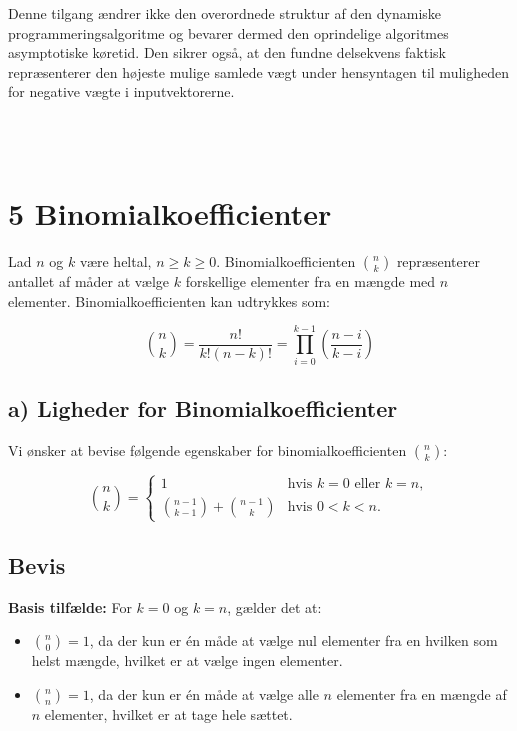 \documentclass{article}
\begin{document}
Denne tilgang ændrer ikke den overordnede struktur af den dynamiske programmeringsalgoritme og bevarer dermed den oprindelige algoritmes asymptotiske køretid. Den sikrer også, at den fundne delsekvens faktisk repræsenterer den højeste mulige samlede vægt under hensyntagen til muligheden for negative vægte i inputvektorerne.

\\
\\

\section*{5 Binomialkoefficienter}

Lad \(n\) og \(k\) være heltal, \(n \geq k \geq 0\). Binomialkoefficienten \(\binom{n}{k}\) repræsenterer antallet af måder at vælge \(k\) forskellige elementer fra en mængde med \(n\) elementer. Binomialkoefficienten kan udtrykkes som:

\[
\binom{n}{k} = \frac{n!}{k!(n-k)!} = \prod_{i=0}^{k-1}\left(\frac{n-i}{k-i}\right)
\]

\subsection*{a) Ligheder for Binomialkoefficienter}

Vi ønsker at bevise følgende egenskaber for binomialkoefficienten \(\binom{n}{k}\):

\[
\binom{n}{k} = 
\begin{cases}
1 & \text{hvis } k=0 \text{ eller } k=n, \\
\binom{n-1}{k-1} + \binom{n-1}{k} & \text{hvis } 0<k<n.
\end{cases}
\]

\subsection*{Bevis}

\textbf{Basis tilfælde:} For \(k=0\) og \(k=n\), gælder det at:
\begin{itemize}
    \item \(\binom{n}{0} = 1\), da der kun er én måde at vælge nul elementer fra en hvilken som helst mængde, hvilket er at vælge ingen elementer.
    \item \(\binom{n}{n} = 1\), da der kun er én måde at vælge alle \(n\) elementer fra en mængde af \(n\) elementer, hvilket er at tage hele sættet.
\end{itemize}
\end{document}
